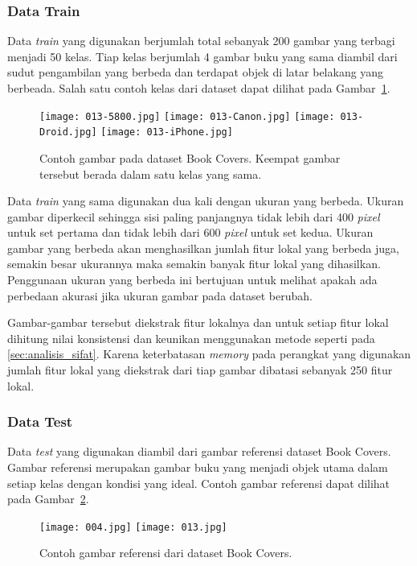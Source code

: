 \subsubsection{Data Train}
Data \textit{train} yang digunakan berjumlah total sebanyak 200 gambar yang terbagi menjadi 50 kelas. Tiap kelas berjumlah 4 gambar buku yang sama diambil dari sudut pengambilan yang berbeda dan terdapat objek di latar belakang yang berbeada. Salah satu contoh kelas dari dataset dapat dilihat pada Gambar~\ref{fig:contoh_book_covers}.
\begin{figure}[H]
	\centering
	\texttt{[image: 013-5800.jpg]}
	\texttt{[image: 013-Canon.jpg]}
	\texttt{[image: 013-Droid.jpg]}
	\texttt{[image: 013-iPhone.jpg]}
	\caption{Contoh gambar pada dataset Book Covers. Keempat gambar tersebut berada dalam satu kelas yang sama.}
	\label{fig:contoh_book_covers}
\end{figure}

Data \textit{train} yang sama digunakan dua kali dengan ukuran yang berbeda. Ukuran gambar diperkecil sehingga sisi paling panjangnya tidak lebih dari 400 \textit{pixel} untuk set pertama dan tidak lebih dari 600 \textit{pixel} untuk set kedua. Ukuran gambar yang berbeda akan menghasilkan jumlah fitur lokal yang berbeda juga, semakin besar ukurannya maka semakin banyak fitur lokal yang dihasilkan. Penggunaan ukuran yang berbeda ini bertujuan untuk melihat apakah ada perbedaan akurasi jika ukuran gambar pada dataset berubah.

Gambar-gambar tersebut diekstrak fitur lokalnya dan untuk setiap fitur lokal dihitung nilai konsistensi dan keunikan menggunakan metode seperti pada \ref{sec:analisis_sifat}. Karena keterbatasan \textit{memory} pada perangkat yang digunakan jumlah fitur lokal yang diekstrak dari tiap gambar dibatasi sebanyak 250 fitur lokal.

\subsubsection{Data Test}
Data \textit{test} yang digunakan diambil dari gambar referensi dataset Book Covers. Gambar referensi merupakan gambar buku yang menjadi objek utama dalam setiap kelas dengan kondisi yang ideal. Contoh gambar referensi dapat dilihat pada Gambar~\ref{fig:referensi_book_covers}.

\begin{figure}[H]
	\centering
	\texttt{[image: 004.jpg]}
	\texttt{[image: 013.jpg]}
	\caption{Contoh gambar referensi dari dataset Book Covers.}
	\label{fig:referensi_book_covers}
\end{figure}

